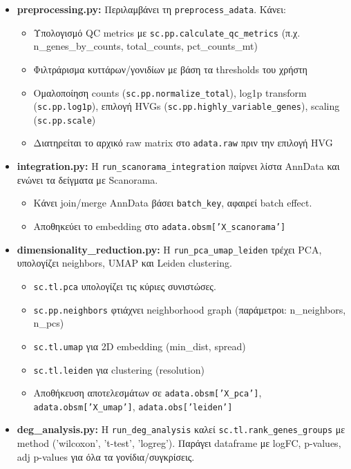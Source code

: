 \documentclass[12pt, a4paper]{article}
\begin{document}
\begin{itemize}
    \item \textbf{preprocessing.py:} Περιλαμβάνει τη \texttt{preprocess\_adata}. Κάνει:
        \begin{itemize}
            \item Υπολογισμό QC metrics με \texttt{sc.pp.calculate\_qc\_metrics} (π.χ. n\_genes\_by\_counts, total\_counts, pct\_counts\_mt)
            \item Φιλτράρισμα κυττάρων/γονιδίων με βάση τα thresholds του χρήστη
            \item Ομαλοποίηση counts (\texttt{sc.pp.normalize\_total}), log1p transform (\texttt{sc.pp.log1p}), επιλογή HVGs (\texttt{sc.pp.highly\_variable\_genes}), scaling (\texttt{sc.pp.scale})
            \item Διατηρείται το αρχικό raw matrix στο \texttt{adata.raw} πριν την επιλογή HVG
        \end{itemize}
    \item \textbf{integration.py:} Η \texttt{run\_scanorama\_integration} παίρνει λίστα AnnData και ενώνει τα δείγματα με Scanorama.
        \begin{itemize}
            \item Κάνει join/merge AnnData βάσει \texttt{batch\_key}, αφαιρεί batch effect.
            \item Αποθηκεύει το embedding στο \texttt{adata.obsm['X\_scanorama']}
        \end{itemize}
    \item \textbf{dimensionality\_reduction.py:} Η \texttt{run\_pca\_umap\_leiden} τρέχει PCA, υπολογίζει neighbors, UMAP και Leiden clustering.
        \begin{itemize}
            \item \texttt{sc.tl.pca} υπολογίζει τις κύριες συνιστώσες.
            \item \texttt{sc.pp.neighbors} φτιάχνει neighborhood graph (παράμετροι: n\_neighbors, n\_pcs)
            \item \texttt{sc.tl.umap} για 2D embedding (min\_dist, spread)
            \item \texttt{sc.tl.leiden} για clustering (resolution)
            \item Αποθήκευση αποτελεσμάτων σε \texttt{adata.obsm['X\_pca']}, \texttt{adata.obsm['X\_umap']}, \texttt{adata.obs['leiden']}
        \end{itemize}
    \item \textbf{deg\_analysis.py:} Η \texttt{run\_deg\_analysis} καλεί \texttt{sc.tl.rank\_genes\_groups} με method ('wilcoxon', 't-test', 'logreg'). Παράγει dataframe με logFC, p-values, adj p-values για όλα τα γονίδια/συγκρίσεις.

\end{itemize}
\end{document}
